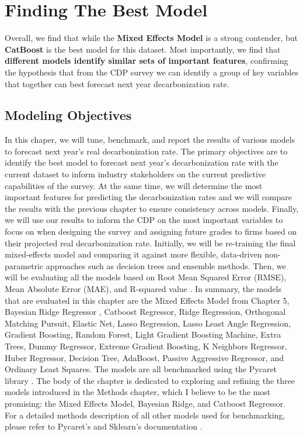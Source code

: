 \chapter{Finding The Best Model}
\label{ch:finding-the-best-model}

\begin{keytakeaway}
    Overall, we find that while the \textbf{Mixed Effects Model} is a strong contender, but \textbf{CatBoost} is the best model for this dataset. Most importantly, we find that \textbf{different models identify similar sets of important features}, confirming the hypothesis that from the CDP survey we can identify a group of key variables that together can best forecast next year decarbonization rate.
\end{keytakeaway}



\section{Modeling Objectives}
In this chaper, we will tune, benchmark, and report the results of various models to forecast next year's real decarbonization rate. The primary objectives are to identify the best model to forecast next year's decarbonization rate with the current dataset to inform industry stakeholders on the current predictive capabilities of the survey. At the same time, we will determine the most important features for predicting the decarbonization rates and we will compare the results with the previous chapter to ensure consistency across models. Finally, we will use our results to inform the CDP on the most important variables to focus on when designing the survey and assigning future grades to firms based on their projected real decarbonization rate. Initially, we will be re-training the final mixed-effects model and comparing it against more flexible, data-driven non-parametric approaches such as decision trees and ensemble methods. Then, we will be evaluating all the models based on Root Mean Squared Error (RMSE), Mean Absolute Error (MAE), and R-squared value \cite{gmd}. In summary, the models that are evaluated in this chapter are the Mixed Effects Model from Chapter 5, Bayesian Ridge Regressor , Catboost Regressor, Ridge Regression, Orthogonal Matching Pursuit, Elastic Net, Lasso Regression, Lasso Least Angle Regression, Gradient Boosting, Random Forest, Light Gradient Boosting Machine, Extra Trees, Dummy Regressor, Extreme Gradient Boosting, K Neighbors Regressor, Huber Regressor, Decision Tree, AdaBoost, Passive Aggressive Regressor, and Ordinary Least Squares. The models are all benchmarked using the Pycaret library \cite{pycaret}. The body of the chapter is dedicated to  exploring and refining the three models introduced in the Methods chapter, which I believe to be the most promising: the Mixed Effects Model, Bayesian Ridge, and Catboost Regressor. For a detailed methods description of all other models used for benchmarking, please refer to Pycaret's and Sklearn's documentation \cite{pycaret,scikit-learn}.


